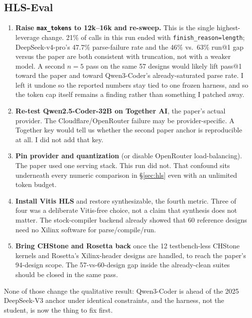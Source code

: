 \documentclass[11pt]{article}
\newcommand{\code}[1]{\texttt{#1}}
\begin{document}
\subsection{HLS-Eval}

\begin{enumerate}
\item \textbf{Raise \code{max\_tokens} to 12k--16k and re-sweep.}
This is the single highest-leverage change. 21\% of calls in this run
ended with \code{finish\_reason=length}; DeepSeek-v4-pro's 47.7\%
parse-failure rate and the 46\% vs.\ 63\% run@1 gap versus the paper
are both consistent with truncation, not with a weaker model. A
second $n=5$ pass on the same 57 designs would likely lift pass@1
toward the paper and toward Qwen3-Coder's already-saturated parse
rate. I left it undone so the reported numbers stay tied to one
frozen harness, and so the token cap itself remains a finding rather
than something I patched away.

\item \textbf{Re-test Qwen2.5-Coder-32B on Together AI}, the paper's
actual provider. The Cloudflare/OpenRouter failure may be
provider-specific. A Together key would tell us whether the second
paper anchor is reproducible at all. I did not add that key.

\item \textbf{Pin provider and quantization} (or disable OpenRouter
load-balancing). The paper used one serving stack. This run did not.
That confound sits underneath every numeric comparison in
\S\ref{sec:hls} even with an unlimited token budget.

\item \textbf{Install Vitis HLS} and restore synthesizable, the fourth
metric. Three of four was a deliberate Vitis-free choice, not a
claim that synthesis does not matter. The stock-compiler backend
already showed that 60 reference designs need no Xilinx software for
parse/compile/run.

\item \textbf{Bring CHStone and Rosetta back} once the 12 testbench-less
CHStone kernels and Rosetta's Xilinx-header designs are handled, to
reach the paper's 94-design scope. The 57-vs-60-design gap inside the
already-clean suites should be closed in the same pass.
\end{enumerate}

None of those change the qualitative result: Qwen3-Coder is ahead of
the 2025 DeepSeek-V3 anchor under identical constraints, and the
harness, not the student, is now the thing to fix first.
\end{document}
